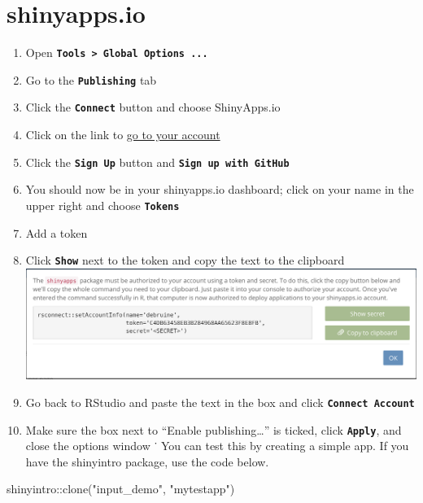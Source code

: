 \documentclass[
  oneside]{book}
\newenvironment{Shaded}{\begin{snugshade}}{\end{snugshade}}
\newcommand{\FunctionTok}[1]{\textcolor[rgb]{0.00,0.00,0.00}{#1}}
\newcommand{\NormalTok}[1]{#1}
\newcommand{\SpecialCharTok}[1]{\textcolor[rgb]{0.00,0.00,0.00}{#1}}
\newcommand{\StringTok}[1]{\textcolor[rgb]{0.31,0.60,0.02}{#1}}
\providecommand{\tightlist}{%
  \setlength{\itemsep}{0pt}\setlength{\parskip}{0pt}}
\begin{document}
\hypertarget{shinyapps.io}{%
\section{shinyapps.io}\label{shinyapps.io}}

\begin{enumerate}
\def\labelenumi{\arabic{enumi}.}
\tightlist
\item
  Open \textbf{\texttt{Tools\ \textgreater{}\ Global\ Options\ ...}}
\item
  Go to the \textbf{\texttt{Publishing}} tab
\item
  Click the \textbf{\texttt{Connect}} button and choose ShinyApps.io
\item
  Click on the link to \href{https://www.shinyapps.io/}{go to your account}
\item
  Click the \textbf{\texttt{Sign\ Up}} button and \textbf{\texttt{Sign\ up\ with\ GitHub}}
\item
  You should now be in your shinyapps.io dashboard; click on your name in the upper right and choose \textbf{\texttt{Tokens}}
\item
  Add a token
\item
  Click \textbf{\texttt{Show}} next to the token and copy the text to the clipboard
  \includegraphics[width=1\textwidth,height=\textheight]{images/saio_secret.png}
\item
  Go back to RStudio and paste the text in the box and click \textbf{\texttt{Connect\ Account}}
\item
  Make sure the box next to ``Enable publishing\ldots{}'' is ticked, click \textbf{\texttt{Apply}}, and close the options window
  ˙
  You can test this by creating a simple app. If you have the shinyintro package, use the code below.
\end{enumerate}

\begin{Shaded}
\begin{Highlighting}[]
\NormalTok{shinyintro}\SpecialCharTok{::}\FunctionTok{clone}\NormalTok{(}\StringTok{"input\_demo"}\NormalTok{, }\StringTok{"mytestapp"}\NormalTok{)}
\end{Highlighting}
\end{Shaded}
\end{document}
